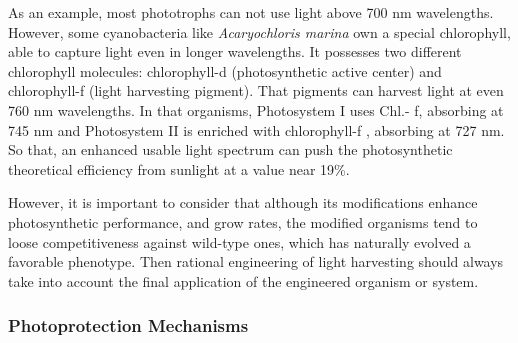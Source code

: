 \begin{itemize}
    As an example, most phototrophs can not use light above 700 nm wavelengths. However, some cyanobacteria like \textit{Acaryochloris marina} own a special chlorophyll, able to capture light even in longer wavelengths. It possesses two different chlorophyll molecules:  chlorophyll-d (photosynthetic active center) and chlorophyll-f (light harvesting pigment). That pigments can harvest light at even 760 nm wavelengths. In that organisms, Photosystem I uses Chl.- f, absorbing at 745 nm and Photosystem II is enriched with chlorophyll-f , absorbing at 727 nm. So that, an enhanced usable light spectrum can push the photosynthetic theoretical efficiency from sunlight at a value near 19\%.
 \end{itemize}
However, it is important to consider that although its modifications enhance photosynthetic performance, and grow rates, the modified organisms tend to loose competitiveness against wild-type ones, which has naturally evolved a favorable phenotype. Then rational engineering of light harvesting should always take into account the final application of the engineered organism or system.
 
\subsubsection{Photoprotection Mechanisms}
 
